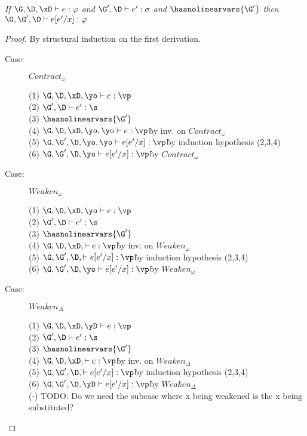 
\begin{lemma}
\emph{If $\G, \D, \xD \vdash e : \varphi$ and $\G', \D \vdash e' : \sigma$ and
    $\hasnolinearvars{\G'}$ then $\G, \G', \D \vdash e[e'/x] : \varphi$}
\end{lemma}
\begin{proof}
By structural induction on the first derivation.

\begin{description}

\item[Case:] $Contract_\omega$
\begin{tabbing}
    (1) $\G, \D, \xD, \yo \vdash e : \vp$\\
    (2) $\G', \D \vdash e' : \s$\\
    (3) $\hasnolinearvars{\G'}$\\
    (4) $\G, \D, \xD, \yo, \yo \vdash e : \vp$\` by inv. on $Contract_\omega$\\
    (5) $\G, \G', \D, \yo, \yo \vdash e[e'/x] : \vp$\` by induction hypothesis (2,3,4)\\
    (6) $\G, \G', \D, \yo \vdash e[e'/x] : \vp$\` by $Contract_\omega$\\
\end{tabbing}

\item[Case:] $Weaken_\omega$
\begin{tabbing}
    (1) $\G, \D, \xD, \yo \vdash e : \vp$\\
    (2) $\G', \D \vdash e' : \s$\\
    (3) $\hasnolinearvars{\G'}$\\
    (4) $\G, \D, \xD, \vdash e : \vp$\` by inv. on $Weaken_\omega$\\
    (5) $\G, \G', \D, \vdash e[e'/x] : \vp$\` by induction hypothesis (2,3,4)\\
    (6) $\G, \G', \D, \yo \vdash e[e'/x] : \vp$\` by $Weaken_\omega$\\
\end{tabbing}

\item[Case:] $Weaken_\Delta$
\begin{tabbing}
    (1) $\G, \D, \xD, \yD \vdash e : \vp$\\
    (2) $\G', \D \vdash e' : \s$\\
    (3) $\hasnolinearvars{\G'}$\\
    (4) $\G, \D, \xD, \vdash e : \vp$\` by inv. on $Weaken_\Delta$\\
    (5) $\G, \G', \D, \vdash e[e'/x] : \vp$\` by induction hypothesis (2,3,4)\\
    (6) $\G, \G', \D, \yD \vdash e[e'/x] : \vp$\` by $Weaken_\Delta$\\
    (-) TODO. Do we need the subcase where x being weakened is the x being
    substituted?\\
\end{tabbing}


\end{description}
\end{proof}
